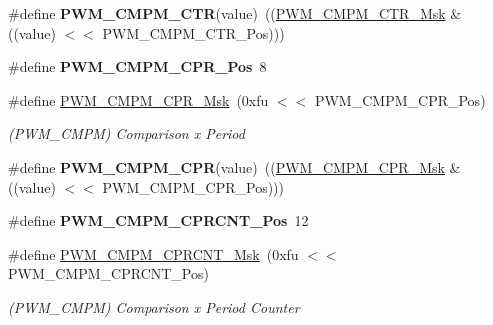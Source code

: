 \begin{DoxyCompactItemize}
\#define {\bfseries P\+W\+M\+\_\+\+C\+M\+P\+M\+\_\+\+C\+TR}(value)~((\mbox{\hyperlink{group__SAMV71__PWM_ga32b8e7533c5db154116c6f8797e18bdc}{P\+W\+M\+\_\+\+C\+M\+P\+M\+\_\+\+C\+T\+R\+\_\+\+Msk}} \& ((value) $<$$<$ P\+W\+M\+\_\+\+C\+M\+P\+M\+\_\+\+C\+T\+R\+\_\+\+Pos)))
\item 
\mbox{\label{group__SAMS70__PWM_ga081a29a209b1ea5b419265afa240cdaa}} 
\#define {\bfseries P\+W\+M\+\_\+\+C\+M\+P\+M\+\_\+\+C\+P\+R\+\_\+\+Pos}~8
\item 
\mbox{\label{group__SAMS70__PWM_ga7951fd10abe22d74f4c2c6e9802a3f2d}} 
\#define \mbox{\hyperlink{group__SAMS70__PWM_ga7951fd10abe22d74f4c2c6e9802a3f2d}{P\+W\+M\+\_\+\+C\+M\+P\+M\+\_\+\+C\+P\+R\+\_\+\+Msk}}~(0xfu $<$$<$ P\+W\+M\+\_\+\+C\+M\+P\+M\+\_\+\+C\+P\+R\+\_\+\+Pos)
\begin{DoxyCompactList}\small\item\em (P\+W\+M\+\_\+\+C\+M\+PM) Comparison x Period \end{DoxyCompactList}\item 
\mbox{\label{group__SAMS70__PWM_ga42d54748d1536414c80dac1643bebbf1}} 
\#define {\bfseries P\+W\+M\+\_\+\+C\+M\+P\+M\+\_\+\+C\+PR}(value)~((\mbox{\hyperlink{group__SAMV71__PWM_ga7951fd10abe22d74f4c2c6e9802a3f2d}{P\+W\+M\+\_\+\+C\+M\+P\+M\+\_\+\+C\+P\+R\+\_\+\+Msk}} \& ((value) $<$$<$ P\+W\+M\+\_\+\+C\+M\+P\+M\+\_\+\+C\+P\+R\+\_\+\+Pos)))
\item 
\mbox{\label{group__SAMS70__PWM_ga836c4e58d85e35a123223da621292f63}} 
\#define {\bfseries P\+W\+M\+\_\+\+C\+M\+P\+M\+\_\+\+C\+P\+R\+C\+N\+T\+\_\+\+Pos}~12
\item 
\mbox{\label{group__SAMS70__PWM_ga2945c884ad4aab06150ae99c19542202}} 
\#define \mbox{\hyperlink{group__SAMS70__PWM_ga2945c884ad4aab06150ae99c19542202}{P\+W\+M\+\_\+\+C\+M\+P\+M\+\_\+\+C\+P\+R\+C\+N\+T\+\_\+\+Msk}}~(0xfu $<$$<$ P\+W\+M\+\_\+\+C\+M\+P\+M\+\_\+\+C\+P\+R\+C\+N\+T\+\_\+\+Pos)
\begin{DoxyCompactList}\small\item\em (P\+W\+M\+\_\+\+C\+M\+PM) Comparison x Period Counter \end{DoxyCompactList}\item 
\mbox{\label{group__SAMS70__PWM_gac3be5e55b87abd7e1687d9be77595a26}} 

\end{DoxyCompactItemize}
